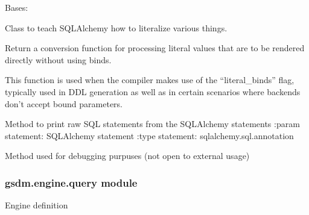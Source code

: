 \begin{fulllineitems}
\label{\detokenize{gsdm.engine:gsdm.engine.printing.StringLiteral}}
Bases: 

Class to teach SQLAlchemy how to literalize various things.

\begin{fulllineitems}
\label{\detokenize{gsdm.engine:gsdm.engine.printing.StringLiteral.literal_processor}}
Return a conversion function for processing literal values that are
to be rendered directly without using binds.

This function is used when the compiler makes use of the
“literal\_binds” flag, typically used in DDL generation as well
as in certain scenarios where backends don’t accept bound parameters.


\end{fulllineitems}


\end{fulllineitems}


\begin{fulllineitems}
\label{\detokenize{gsdm.engine:gsdm.engine.printing.literal_query}}
Method to print raw SQL statements from the SQLAlchemy statements
:param statement: SQLAlchemy statement
:type statement: sqlalchemy.sql.annotation

Method used for debugging purpuses (not open to external usage)

\end{fulllineitems}



\subsubsection{gsdm.engine.query module}
\label{\detokenize{gsdm.engine:module-gsdm.engine.query}}\label{\detokenize{gsdm.engine:gsdm-engine-query-module}}
Engine definition

